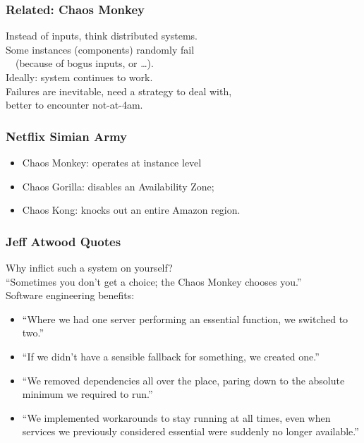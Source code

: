 \documentclass{beamer}
\newenvironment{changemargin}[1]{%
  \begin{list}{}{%
    \setlength{\topsep}{0pt}%
    \setlength{\leftmargin}{#1}%
    \setlength{\rightmargin}{1em}
    \setlength{\listparindent}{\parindent}%
    \setlength{\itemindent}{\parindent}%
    \setlength{\parsep}{\parskip}%
  }%
  \item[]}{\end{list}}
\begin{document}
\begin{frame}
  \frametitle{Related: Chaos Monkey}
  \large
  \begin{changemargin}{2em}
    Instead of inputs, think distributed systems.\\[1em]
    Some instances (components) randomly fail\\
    ~~(because of bogus inputs, or \ldots).\\[1em]

    Ideally: system continues to work.\\[1em]

    Failures are inevitable, need a strategy to deal with,\\
    better to encounter not-at-4am.
  \end{changemargin}
\end{frame}

\begin{frame}
  \frametitle{Netflix Simian Army}
  \large
  \begin{changemargin}{2em}
    \begin{itemize}
      \item Chaos Monkey: operates at instance level
      \item Chaos Gorilla: disables an Availability Zone;
      \item Chaos Kong: knocks out an entire Amazon region.
    \end{itemize}
  \end{changemargin}
\end{frame}


\begin{frame}
  \frametitle{Jeff Atwood Quotes}
  \large
  \begin{changemargin}{2em}
    Why inflict such a system on yourself?\\
    ``Sometimes you don't get a choice; the Chaos Monkey chooses you.''\\[1em]

    Software engineering benefits:
\begin{itemize}
\item    ``Where we had one server performing an essential function, we switched to two.''
\item    ``If we didn't have a sensible fallback for something, we created one.''
\item    ``We removed dependencies all over the place, paring down to the absolute minimum we required to run.''
\item     ``We implemented workarounds to stay running at all times, even when services we previously considered essential were suddenly no longer available.''
\end{itemize}
  \end{changemargin}
\end{frame}

  
\end{document}
